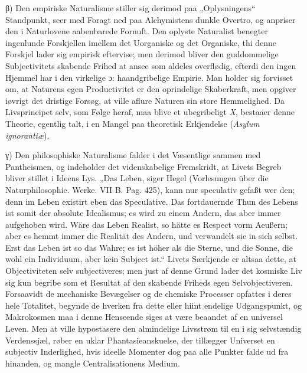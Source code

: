 \documentclass[12pt]{book}
\newcommand{\dsi}{\textup{ɔ:}}
\newcommand{\opage}[1]{\marginnote{\footnotesize\textit{[#1]}}}
\begin{document}
\noindent β) Den empiriske Naturalisme stiller sig derimod paa „Oplysningens“ Standpunkt,
seer med Foragt ned paa Alchymistens dunkle Overtro, og anpriser den i Naturlovene
aabenbarede Fornuft. Den oplyste Naturalist benegter ingenlunde Forskjellen imellem det
Uorganiske og det Organiske, thi denne Forskjel lader sig empirisk eftervise; men derimod
bliver den guddommelige Subjectivitets skabende Frihed at ansee som aldeles overflødig,
efterdi den ingen Hjemmel har i den virkelige \dsi{} haandgribelige Empirie. Man holder sig
forvisset om, at Naturens egen Productivitet er den oprindelige Skaberkraft, men opgiver
iøvrigt det dristige Forsøg, at ville aflure Naturen sin store Hemmelighed. Da Livsprincipet
selv, som Følge heraf, maa blive et ubegribeligt \textit{X}, bestaaer denne Theorie, egentlig
talt, i en Mangel paa theoretisk Erkjendelse (\textit{Asylum ignorantiæ}).

γ) Den philosophiske Naturalisme falder i det Væsentlige sammen med Pantheismen, og
indeholder det videnskabelige Fremskridt, at Livets Begreb bliver stillet i Ideens Lys. „Das
Leben, siger Hegel (Vorlesungen über die Naturphilosophie. Werke. VII B. Pag. 425), kann nur
speculativ gefaßt wer
\opage{221} den; denn im Leben existirt eben das Speculative. Das fortdauernde Thun des Lebens ist somit
der absolute Idealismus; es wird zu einem Andern, das aber immer aufgehoben wird. Wäre das
Leben Realist, so hätte es Respect vorm Aeußern; aber es hemmt immer die Realität des
Andern, und verwandelt sie in sich selbst. Erst das Leben ist so das Wahre; es ist höher als
die Sterne, und die Sonne, die wohl ein Individuum, aber kein Subject ist.“
Livets Særkjende er altsaa dette, at Objectiviteten selv subjectiveres; men just af denne
Grund lader det kosmiske Liv sig kun begribe som et Resultat af den skabende Friheds egen
Selvobjectiveren. Forsaavidt de mechaniske Bevægelser og de chemiske Processer opfattes i
deres hele Totalitet, begynde de hverken fra dette eller hiint endelige Udgangspunkt, og
Makrokosmen maa i denne Henseende siges at være beaandet af en universel Leven. Men at ville
hypostasere den almindelige Livsstrøm til en i sig selvstændig Verdenssjæl, røber en uklar
Phantasieanskuelse, der tillægger Universet en subjectiv Inderlighed, hvis ideelle Momenter
dog paa alle Punkter falde ud fra hinanden, og mangle Centralisationens Medium.
\end{document}
